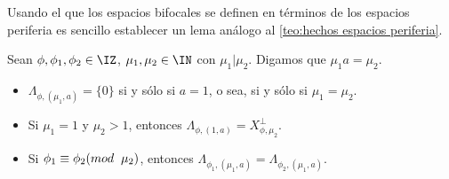 Usando el que los espacios bifocales se
definen en términos de los espacios periferia
es sencillo establecer un lema análogo al
\ref{teo:hechos espacios periferia}.
\begin{lema} \label{lema: algunos hechos sobre espacios bifocales}
Sean $\phi, \phi_{1}, \phi_{2} \in \IZ$, $\mu_{1}, \mu_{2} \in \IN$
con $\mu_{1} | \mu_{2}$. Digamos que $\mu_{1}a = \mu_{2}$.
\begin{itemize}
\item $\Lambda_{\phi, (\mu_{1}, a)} = \{ 0\}$ si y sólo si
$a=1$, o sea, si y sólo si $\mu_{1}=\mu_{2}$.
\item Si $\mu_{1}=1$ y $\mu_{2}>1$, entonces 
$\Lambda_{\phi, (1 , a)}= X_{\phi, \mu_{2}}^{\perp}$.
\item Si $\phi_{1} \equiv \phi_{2} (mod \hspace{0.2cm} \mu_{2})$,
entonces 
$\Lambda_{\phi_{1}, (\mu_{1}, a)}= \Lambda_{\phi_{2}, (\mu_{1}, a)}$.
\end{itemize}
\end{lema}
